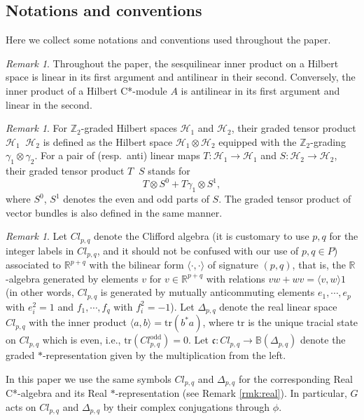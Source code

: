 \documentclass[11pt]{amsart}
\theoremstyle{definition}
\theoremstyle{plain}
\theoremstyle{remark}
\newtheorem{rmk}[equation]{Remark}
\newcommand{\bB}{\mathbb{B}}
\newcommand{\bR}{\mathbb{R}}
\newcommand{\bZ}{\mathbb{Z}}
\newcommand{\fc}{\mathfrak{c}}
\newcommand{\sH}{\mathscr{H}}
\newcommand{\Cl}{\mathit{Cl}}
\DeclareMathOperator{\hotimes}{\hat{\otimes}}
\begin{document}
\subsection{Notations and conventions}
Here we collect some notations and conventions used throughout the paper.  

\begin{rmk}
Throughout the paper, the sesquilinear inner product on a Hilbert space is linear in its first argument and antilinear in their second. 
Conversely, the inner product of a Hilbert C*-module $A$ is antilinear in its first argument and linear in the second. 
\end{rmk}


\begin{rmk}
For $\bZ_2$-graded Hilbert spaces $\sH_1$ and $\sH_2$, their graded tensor product $\sH_1 \hotimes \sH_2$ is defined as the Hilbert space $\sH_1 \otimes \sH_2$ equipped with the $\bZ_2$-grading $\gamma_1 \otimes \gamma_2$. For a pair of (resp.\ anti) linear maps $T \colon \sH_1 \to \sH_1$ and $S \colon \sH_2 \to \sH_2$, their graded tensor product $T \hotimes S$ stands for
\[ T  \otimes S^0 + T \gamma_1 \otimes S^1, \] 
where $S^0$, $S^1$ denotes the even and odd parts of $S$. The graded tensor product of vector bundles is also defined in the same manner. 
\end{rmk}

\begin{rmk}\label{rmk:Cliffordalgebra}
Let $\Cl_{p,q}$ denote the Clifford algebra (it is customary to use $p,q$ for the integer labels in $Cl_{p,q}$, and it should not be confused with our use of $p,q\in P$) associated to $\bR^{p+q}$ with the bilinear form $\langle \cdot , \cdot  \rangle$ of signature $(p,q)$, 
that is, the $\bR$-algebra generated by elements $v$ for $v \in \bR^{p+q}$ with relations $vw+wv = \langle v,w \rangle 1$ (in other words, $\Cl_{p,q}$ is generated by mutually anticommuting elements $e_1,\cdots, e_p$ with $e_i^2=1$ and $f_1,\cdots, f_q$ with $f_i^2=-1$). 
Let $\Delta_{p,q}$ denote the real linear space $\Cl_{p,q}$ with the inner product $\langle a,b \rangle =\mathrm{tr} (b^*a)$, where $\mathrm{tr}$ is the unique tracial state on $\Cl_{p,q}$ which is even, i.e., $\mathrm{tr}(\Cl_{p,q}^{\mathrm{odd}})=0$. Let $\fc \colon \Cl_{p,q} \to \bB(\Delta_{p,q})$ denote the graded $\ast$-representation given by the multiplication from the left. 

In this paper we use the same symbols $\Cl_{p,q}$ and $\Delta _{p,q}$ for the corresponding Real C*-algebra and its Real $\ast$-representation (see Remark \ref{rmk:real}). In particular, $G$ acts on $\Cl_{p,q}$ and $\Delta _{p,q}$ by their complex conjugations through $\phi$.  
\end{rmk}
\end{document}
